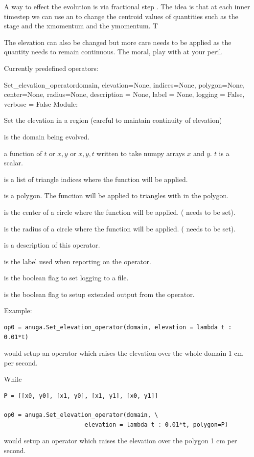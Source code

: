 \documentclass{manual}
\begin{document}
A way to effect the evolution is via fractional step .  The idea is that at each inner timestep we can use 
an  to change the centroid values of quantities such as the stage and the xmomentum and the ymomentum. T

The elevation can also be changed but more care needs to be applied as the  quantity needs to remain continuous. The moral, play with  at your peril. 

Currently predefined operators:


\begin{classdesc}{Set_elevation_operator}{domain,
                 elevation=None,
                 indices=None,
                 polygon=None,
                 center=None,
                 radius=None,
                 description = None,
                 label = None,
                 logging = False,
                 verbose = False}
Module: 

Set the elevation in a region (careful to maintain continuity of elevation)


 is the domain being evolved.

 a function of $t$ or $x,y$ or $x,y,t$ written to take numpy arrays $x$ and $y$. $t$ is a scalar.

 is a list of triangle indices where the function  will be applied.

 is a polygon. The function  will be applied to triangles with in the polygon.

 is the center of a circle where the function  will be applied. ( needs to be set).

 is the radius of a circle where the function  will be applied. ( needs to be set).

 is a description of this operator.

 is the label used when reporting on the operator.

 is the boolean flag to set logging to a file. 

 is the boolean flag to setup extended output from the operator. 

Example:

\begin{verbatim}
op0 = anuga.Set_elevation_operator(domain, elevation = lambda t : 0.01*t)
\end{verbatim}
would setup an operator which raises the elevation over the whole domain 1 cm per second.


While 
\begin{verbatim}
P = [[x0, y0], [x1, y0], [x1, y1], [x0, y1]] 

op0 = anuga.Set_elevation_operator(domain, \
                       elevation = lambda t : 0.01*t, polygon=P)
\end{verbatim}
would setup an operator which raises the elevation over the polygon  1 cm per second.

\end{classdesc}
\end{document}
